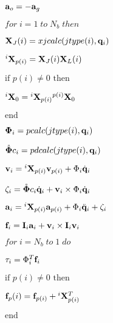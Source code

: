 \documentclass{article}
\begin{document}
${\bf a}_o = -{\bf a}_g$
\pagebreak

$for \; i=1\; to \; N_b \; then$
\pagebreak

${\bf X}_J(i) = xjcalc(jtype(i),{\bf q}_i)$
\pagebreak

${^i{\bf X}}_{p(i)} = {\bf X}_J(i){\bf X}_L(i)$
\pagebreak

$\text{if } p(i)\neq 0 \text{ then }$
\pagebreak

${^i{\bf X}_0} = {^i{\bf X}_{p(i)}} {^{p(i)}{\bf X}_0} $
\pagebreak

$ \text{end}$
\pagebreak

$ {\bf \Phi}_i = pcalc(jtype(i),{\bf q}_i)$
\pagebreak

$ {\mathring{\bf \Phi}}c_i = pdcalc(jtype(i),{\bf q}_i)$
\pagebreak

$ {\bf v}_i = {^i{\bf X}_{p(i)}}{\bf v}_{p(i)} + \Phi_i\dot{\bf q}_i$
\pagebreak

$ {\bf \zeta}_i = {\mathring{\bf \Phi}}c_i \dot{\bf q}_i + {\bf v}_i \times \Phi_i\dot{\bf q}_i $
\pagebreak

$ {\bf a}_i = {^i{\bf X}_{p(i)}} {\bf a}_{p(i)} + \Phi_i \ddot{\bf q}_i + {\bf \zeta}_i $
\pagebreak

$ {\bf f}_i = {\bf I}_i {\bf a}_i + {\bf v}_i \times {\bf I}_i {\bf v}_i $
\pagebreak

$ for \; i=N_b\; to \; 1 \; do $
\pagebreak

$ {\bf \tau}_i = \Phi_i^T {\bf f}_i $
\pagebreak

$ \text{if } p(i)\neq 0 \text{ then } $
\pagebreak

${\bf f}_p(i) = {\bf f}_{p(i)} + {^i}{\bf X}_{p(i)}^T $
\pagebreak

$ \text{end} $
\pagebreak
\end{document}
